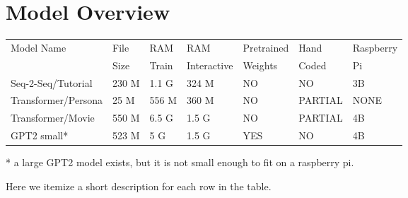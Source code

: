 \section{Model Overview}


\begin{table}[h]
	
	\begin{center}
		
		
		\begin{tabular}{lllllll}
			
			Model Name    & File  & RAM  & RAM  & Pretrained  & Hand & Raspberry \\
			&  Size & Train   & Interactive   & Weights & Coded &   Pi \\
			\hline
			\hline
			Seq-2-Seq/Tutorial & 230 M     & 1.1 G & 324 M & NO                 & NO  &   3B \\
			Transformer/Persona   & 25 M      & 556 M & 360 M & NO         & PARTIAL  & NONE \\
			Transformer/Movie   & 550 M      & 6.5 G & 1.5 G & NO         & PARTIAL    & 4B  \\
			GPT2 small*   & 523 M     & 5 G   & 1.5 G & YES                & NO     &  4B \\
			\hline
		\end{tabular}
		
		* a large GPT2 model exists, but it is not small enough to fit on a raspberry pi.
		
		
	\end{center}
	
	\label{fig:modeloverview}
\end{table}


Here we itemize a short description for each row in the table.

